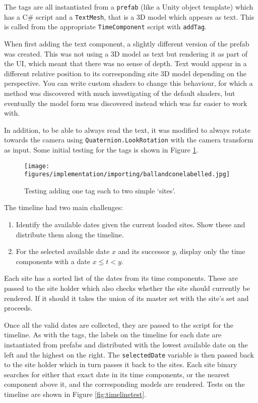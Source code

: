 \documentclass{article}
\begin{document}
The tags are all instantiated from a \verb|prefab| (like a Unity object template) which has a C\# script and a \verb|TextMesh|, that is a 3D model which appears as text. This is called from the appropriate \verb|TimeComponent| script with \verb|addTag|.

When first adding the text component, a slightly different version of the prefab was created. This was not using a 3D model as text but rendering it as part of the UI, which meant that there was no sense of depth. Text would appear in a different relative position to its corresponding site 3D model depending on the perspective. You can write custom shaders to change this behaviour, for which a method was discovered with much investigating of the default shaders, but eventually the model form was discovered instead which was far easier to work with. 

In addition, to be able to always read the text, it was modified to always rotate towards the camera using \verb|Quaternion.LookRotation| with the camera transform as input. Some initial testing for the tags is shown in Figure 
\ref{fig:ballconetag}.
\begin{figure}[h]
    \centering
    \texttt{[image: figures/implementation/importing/ballandconelabelled.jpg]}
        \caption{Testing adding one tag each to two simple `sites'.}
        \label{fig:ballconetag}
\end{figure}

The timeline had two main challenges:
\begin{enumerate}
    \item Identify the available dates given the current loaded sites. Show these and distribute them along the timeline.
    \item For the selected available date $x$ and its successor $y$, display only the time components with a date $x \leq t < y$.
\end{enumerate}

Each site has a sorted list of the dates from its time components. These are passed to the site holder which also checks whether the site should currently be rendered. If it should it takes the union of its master set with the site's set and proceeds. 

Once all the valid dates are collected, they are passed to the script for the timeline. As with the tags, the labels on the timeline for each date are instantiated from prefabs and distributed with the lowest available date on the left and the highest on the right. The \verb|selectedDate| variable is then passed back to the site holder which in turn passes it back to the sites. Each site binary searches for either that exact date in its time components, or the nearest component above it, and the corresponding models are rendered. Tests on the timeline are shown in Figure \ref{fig:timelinetest}.
\end{document}
